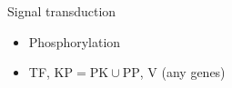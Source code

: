 Signal transduction
\begin{itemize}
    \item Phosphorylation
    \item TF, $\text{KP} = \text{PK} \cup \text{PP}$, V (any genes)

\end{itemize}
